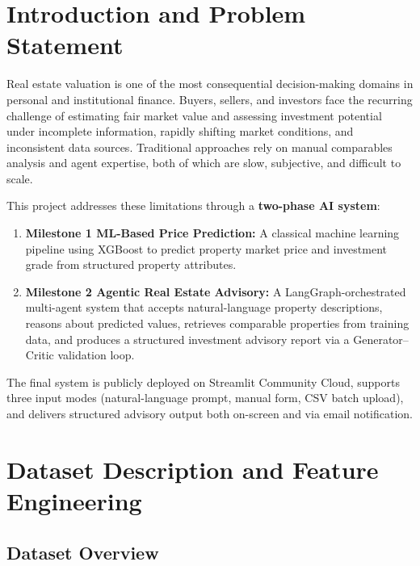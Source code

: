 \documentclass[12pt,a4paper]{article}
\begin{document}
\section{Introduction and Problem Statement}

Real estate valuation is one of the most consequential decision-making domains in personal and institutional finance. Buyers, sellers, and investors face the recurring challenge of estimating fair market value and assessing investment potential under incomplete information, rapidly shifting market conditions, and inconsistent data sources. Traditional approaches rely on manual comparables analysis and agent expertise, both of which are slow, subjective, and difficult to scale.

This project addresses these limitations through a \textbf{two-phase AI system}:

\begin{enumerate}[label=\arabic*., leftmargin=*, itemsep=4pt]
  \item \textbf{Milestone 1 \textemdash{} ML-Based Price Prediction:} A classical machine learning pipeline using XGBoost to predict property market price and investment grade from structured property attributes.
  \item \textbf{Milestone 2 \textemdash{} Agentic Real Estate Advisory:} A LangGraph-orchestrated multi-agent system that accepts natural-language property descriptions, reasons about predicted values, retrieves comparable properties from training data, and produces a structured investment advisory report via a Generator--Critic validation loop.
\end{enumerate}

The final system is publicly deployed on Streamlit Community Cloud, supports three input modes (natural-language prompt, manual form, CSV batch upload), and delivers structured advisory output both on-screen and via email notification.

\section{Dataset Description and Feature Engineering}

\subsection{Dataset Overview}
\end{document}
